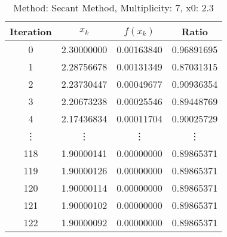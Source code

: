 \begin{table}
\centering
\caption{Method: Secant Method, Multiplicity: 7, x0: 2.3}
\label{tab:table_Secant_Method_7_2_3}
\begin{tabular}{c c c c}
\toprule
Iteration &      $x_k$ &   $f(x_k)$ &      Ratio \\
\midrule
        0 & 2.30000000 & 0.00163840 & 0.96891695 \\
        1 & 2.28756678 & 0.00131349 & 0.87031315 \\
        2 & 2.23730447 & 0.00049677 & 0.90936354 \\
        3 & 2.20673238 & 0.00025546 & 0.89448769 \\
        4 & 2.17436834 & 0.00011704 & 0.90025729 \\
   \vdots &     \vdots &     \vdots &     \vdots \\
      118 & 1.90000141 & 0.00000000 & 0.89865371 \\
      119 & 1.90000126 & 0.00000000 & 0.89865371 \\
      120 & 1.90000114 & 0.00000000 & 0.89865371 \\
      121 & 1.90000102 & 0.00000000 & 0.89865371 \\
      122 & 1.90000092 & 0.00000000 & 0.89865371 \\
\bottomrule
\end{tabular}
\end{table}
